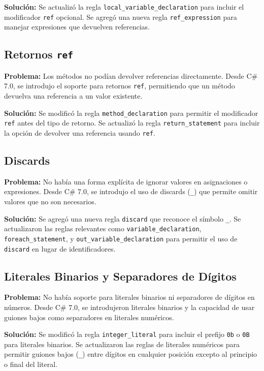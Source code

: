 \textbf{Solución:} Se actualizó la regla \texttt{local\_variable\_declaration} para incluir el modificador \texttt{ref} opcional. Se agregó una nueva regla \texttt{ref\_expression} para manejar expresiones que devuelven referencias.

\subsection*{Retornos \texttt{ref}}
\textbf{Problema:} Los métodos no podían devolver referencias directamente. Desde C\# 7.0, se introdujo el soporte para retornos \texttt{ref}, permitiendo que un método devuelva una referencia a un valor existente.

\textbf{Solución:} Se modificó la regla \texttt{method\_declaration} para permitir el modificador \texttt{ref} antes del tipo de retorno. Se actualizó la regla \texttt{return\_statement} para incluir la opción de devolver una referencia usando \texttt{ref}.

\subsection*{Discards}
\textbf{Problema:} No había una forma explícita de ignorar valores en asignaciones o expresiones. Desde C\# 7.0, se introdujo el uso de discards (\texttt{\_}) que permite omitir valores que no son necesarios.

\textbf{Solución:} Se agregó una nueva regla \texttt{discard} que reconoce el símbolo \texttt{\_}. Se actualizaron las reglas relevantes como \texttt{variable\_declaration}, \texttt{foreach\_statement}, y \texttt{out\_variable\_declaration} para permitir el uso de \texttt{discard} en lugar de identificadores.

\subsection*{Literales Binarios y Separadores de Dígitos}
\textbf{Problema:} No había soporte para literales binarios ni separadores de dígitos en números. Desde C\# 7.0, se introdujeron literales binarios y la capacidad de usar guiones bajos como separadores en literales numéricos.

\textbf{Solución:} Se modificó la regla \texttt{integer\_literal} para incluir el prefijo \texttt{0b} o \texttt{0B} para literales binarios. Se actualizaron las reglas de literales numéricos para permitir guiones bajos (\texttt{\_}) entre dígitos en cualquier posición excepto al principio o final del literal.

